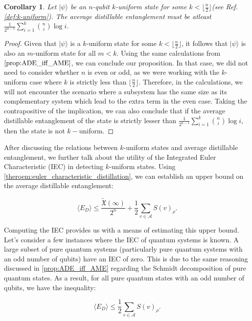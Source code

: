 \documentclass{article}
\newtheorem{corollary}[theorem]{Corollary}
\newcommand{\ket}[1]{|#1\rangle}
\begin{document}
\begin{corollary}
\label{corollary:lower_bound_of_k-uniform}
    Let $\ket{\psi}$ be an $n$-qubit $k$-uniform state for some $k < \lfloor \frac{n}{2} \rfloor$(see Ref. \ref{def:k-uniform}). The average distillable entanglement must be atleast $\frac{1}{2^{n-1}} \sum_{i=1}^{k} \binom{n}{i} \log i$.
\end{corollary}
\begin{proof}
Given that $\ket{\psi}$ is a $k$-uniform state for some $k < \lfloor \frac{n}{2} \rfloor$, it follows that $\ket{\psi}$ is also an $m$-uniform state for all $m < k$. Using the same calculations from $\ref{prop:ADE_iff_AME}$, we can conclude our proposition. In that case, we did not need to consider whether $n$ is even or odd, as we were working with the $k$-uniform case where $k$ is strictly less than $\lfloor \frac{n}{2} \rfloor$. Therefore, in the calculations, we will not encounter the scenario where a subsystem has the same size as its complementary system which lead to the extra term in the even case. Taking the contrapositive of the implication, we can also conclude that if the average distillable entanglement of the state is strictly lesser than $\frac{1}{2^{n-1}} \sum_{i=1}^{k} \binom{n}{i} \log i$, then the state is not $k-$uniform.
\end{proof}

After discussing the relations between $k$-uniform states and average distillable entanglement, we further talk about the utility of the Integrated Euler Characteristic (IEC) in detecting $k$-uniform states. Using \ref{theroem:euler_characteristic_distillation}, we can establish an upper bound on the average distillable entanglement:

\begin{equation}    
\langle E_D \rangle \leq \frac{\tilde{\mathfrak{X}}(\infty)}{2^n} + \frac{1}{2} \sum_{v \in \mathcal{A}}  S(v)_{\rho}.
\end{equation}


Computing the IEC provides us with a means of estimating this upper bound. Let's consider a few instances where the IEC of quantum systems is known. A large subset of pure quantum systems (particularly pure quantum systems with an odd number of qubits) have an IEC of zero. This is due to the same reasoning discussed in \ref{prop:ADE_iff_AME} regarding the Schmidt decomposition of pure quantum states. As a result, for all pure quantum states with an odd number of qubits, we have the inequality:

\begin{equation}
\label{eq:ADE_leq_correlation}
\langle E_D \rangle \leq \frac{1}{2} \sum_{v \in \mathcal{A}}  S(v)_{\rho}.
\end{equation}
\end{document}
